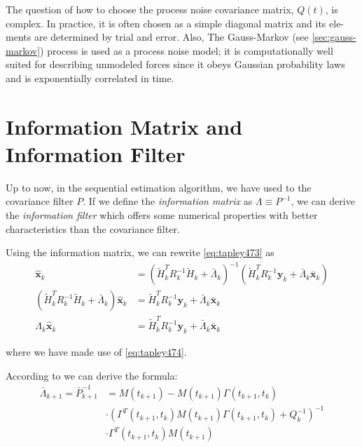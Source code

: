 The question of how to choose the process noise covariance matrix, \(Q(t)\), is
complex. In practice, it is often chosen as a simple diagonal matrix and its ele-
ments are determined by trial and error. Also, The Gauss-Markov (see \ref{sec:gauss-markov})
process is used as a process noise model; it is computationally well suited for 
describing unmodeled forces since it obeys Gaussian probability laws and is exponentially 
correlated in time.

\section{Information Matrix and Information Filter}
\label{sec:information-matrix-and-information-filter}
Up to now, in the sequential estimation algorithm, we have used to the covariance filter 
\(P\). If we define the \emph{information matrix} as \(\Lambda \equiv P^{-1}\), we can 
derive the \emph{information filter} which offers some numerical properties with better 
characteristics than the covariance filter.

Using the information matrix, we can rewrite \ref{eq:tapley473} as
\begin{equation}
  \label{eq:tapley4101}
  \begin{aligned}
    \hat{\bm{x}} _k &= \left( \tilde{H}^T_k R^{-1}_k \tilde{H}_k 
      + \bar{\Lambda}_k \right)^{-1} \left( \tilde{H}^T_k R^{-1}_k \bm{y}_k + 
        \bar{\Lambda}_k \bar{\bm{x}}_k \right) \\
    \left( \tilde{H}^T_k R^{-1}_k \tilde{H}_k + \bar{\Lambda}_k \right) \hat{\bm{x}} _k &= 
      \tilde{H}^T_k R^{-1}_k \bm{y}_k + \bar{\Lambda}_k \bar{\bm{x}}_k \\
    \Lambda _k \hat{\bm{x}} _k &= 
      \tilde{H}^T_k R^{-1}_k \bm{y}_k + \bar{\Lambda}_k \bar{\bm{x}}_k
  \end{aligned}
\end{equation}

where we have made use of \ref{eq:tapley474}.

According to \cite{tapley} we can derive the formula:
\begin{equation}
  \label{eq:tapley4104}
  \begin{split}
    \bar{\Lambda}_{k+1} = \bar{P}^{-1}_{k+1} &= 
      M(t_{k+1}) - M(t_{k+1}) \Gamma (t_{k+1}, t_k ) \\
    & \cdot \left( \Gamma ^T (t_{k+1}, t_k ) M(t_{k+1}) \Gamma (t_{k+1}, t_k ) + Q^{-1}_k \right) ^{-1} \\
    & \cdot \Gamma ^T (t_{k+1}, t_k ) M(t_{k+1})
  \end{split}
\end{equation}

